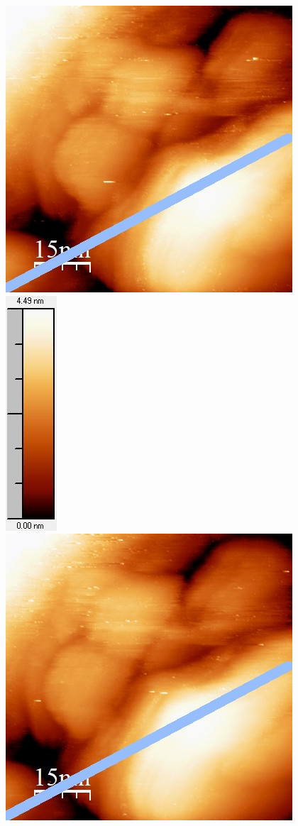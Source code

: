 \documentclass[12pt,a4paper]{article}
\begin{document}
\begin{figure}
\centering
\includegraphics[scale=0.6]{Bilder/Anhang/Zeit/0_2_Zeit_vor.jpg}
\includegraphics[scale=0.6]{Bilder/Anhang/Zeit/0_2_Zeit_vor_Skala.jpg}
\includegraphics[scale=0.6]{Bilder/Anhang/Zeit/0_2_Zeit_nach.jpg}

\end{figure}
\end{document}

